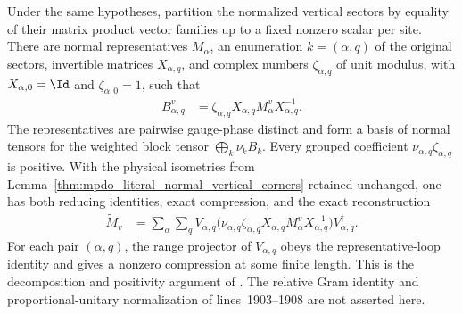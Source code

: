 \begin{theorem}
    \label{thm:cpsv_literal_vertical_bnt_grouping_with_isometries}
    \leanok
    Under the same hypotheses, partition the normalized vertical sectors by
    equality of their matrix product vector families up to a fixed nonzero
    scalar per site. There are normal representatives $M_\alpha$, an enumeration
    $k=(\alpha,q)$ of the original sectors, invertible matrices
    $X_{\alpha,q}$, and complex numbers $\zeta_{\alpha,q}$ of unit modulus,
    with $X_{\alpha,0}=\Id$ and $\zeta_{\alpha,0}=1$, such that
    \begin{align}
        B_{\alpha,q}^v
         & =\zeta_{\alpha,q}X_{\alpha,q}
        M_\alpha^vX_{\alpha,q}^{-1}.
        \label{eq:cpsv_literal_vertical_gauge_phase}
    \end{align}
    The representatives are pairwise gauge-phase distinct and form a basis of
    normal tensors for the weighted block tensor
    $\bigoplus_k\nu_kB_k$. Every grouped coefficient
    $\nu_{\alpha,q}\zeta_{\alpha,q}$ is positive. With the physical isometries
    from Lemma~\ref{thm:mpdo_literal_normal_vertical_corners}
    retained unchanged, one has both reducing identities, exact compression,
    and the exact reconstruction
    \begin{align}
        \widetilde M_v
         & =\sum_\alpha\sum_q
        V_{\alpha,q}
        \bigl(\nu_{\alpha,q}\zeta_{\alpha,q}
        X_{\alpha,q}M_\alpha^vX_{\alpha,q}^{-1}\bigr)
        V_{\alpha,q}^\dagger.
        \label{eq:cpsv_literal_vertical_grouped_reconstruction}
    \end{align}
    For each pair $(\alpha,q)$, the range projector of $V_{\alpha,q}$ obeys
    the representative-loop identity and gives a nonzero compression at some
    finite length. This is the decomposition and positivity argument of
    \cite[Proposition~4.13, lines 1898--1902]{Cirac2016MPDO_arXiv}. The
    relative Gram identity and proportional-unitary normalization of
    lines~1903--1908 are not asserted here.
\end{theorem}

